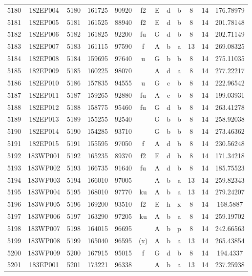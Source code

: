\begin{tabular}{|*{12}{c|}}
5180 & 182EP004 & 5180 & 161725 & 90920 & f2 & E & d & b & 8 & 14 & 176.78979 \\ 
5181 & 182EP005 & 5181 & 161525 & 88940 & f2 & E & d & b & 8 & 14 & 201.78148 \\ 
5182 & 182EP006 & 5182 & 161825 & 92200 & fu & G & d & b & 8 & 14 & 202.71149 \\ 
5183 & 182EP007 & 5183 & 161115 & 97590 & f & A & b & a & 13 & 14 & 269.08325 \\ 
5184 & 182EP008 & 5184 & 159695 & 97640 & u & G & b & b & 8 & 14 & 275.11035 \\ 
5185 & 182EP009 & 5185 & 160225 & 98070 &  & A & d & a & 8 & 14 & 277.22217 \\ 
5186 & 182EP010 & 5186 & 157835 & 94555 & u & G & c & b & 8 & 14 & 222.96542 \\ 
5187 & 182EP011 & 5187 & 159265 & 92880 & fu & A & c & b & 8 & 14 & 199.03931 \\ 
5188 & 182EP012 & 5188 & 158775 & 95460 & fu & G & d & b & 8 & 14 & 263.41278 \\ 
5189 & 182EP013 & 5189 & 155255 & 92540 &  & G & b & b & 8 & 14 & 258.92038 \\ 
5190 & 182EP014 & 5190 & 154285 & 93710 &  & G & b & b & 8 & 14 & 273.46362 \\ 
5191 & 182EP015 & 5191 & 155595 & 97050 & f & A & d & b & 8 & 14 & 230.56248 \\ 
5192 & 183WP001 & 5192 & 165235 & 89370 & f2 & E & d & b & 8 & 14 & 171.34218 \\ 
5193 & 183WP002 & 5193 & 166735 & 91640 & fu & A & d & b & 8 & 14 & 185.75523 \\ 
5194 & 183WP003 & 5194 & 166010 & 97005 &  & A & b & a & 13 & 14 & 259.82343 \\ 
5195 & 183WP004 & 5195 & 168010 & 97770 & ku & A & b & a & 13 & 14 & 279.24207 \\ 
5196 & 183WP005 & 5196 & 169200 & 93510 & f2 & E & h & x & 8 & 14 & 168.5887 \\ 
5197 & 183WP006 & 5197 & 163290 & 97205 & ku & A & b & a & 8 & 14 & 259.19702 \\ 
5198 & 183WP007 & 5198 & 164015 & 96695 &  & A & b & p & 8 & 14 & 242.66563 \\ 
5199 & 183WP008 & 5199 & 165040 & 96595 & (x) & A & b & a & 13 & 14 & 265.43854 \\ 
5200 & 183WP009 & 5200 & 167915 & 95015 & f & G & d & b & 8 & 14 & 194.4337 \\ 
5201 & 183EP001 & 5201 & 173221 & 96338 &  & A & b & a & 13 & 14 & 237.25938 \\ 

\end{tabular}
